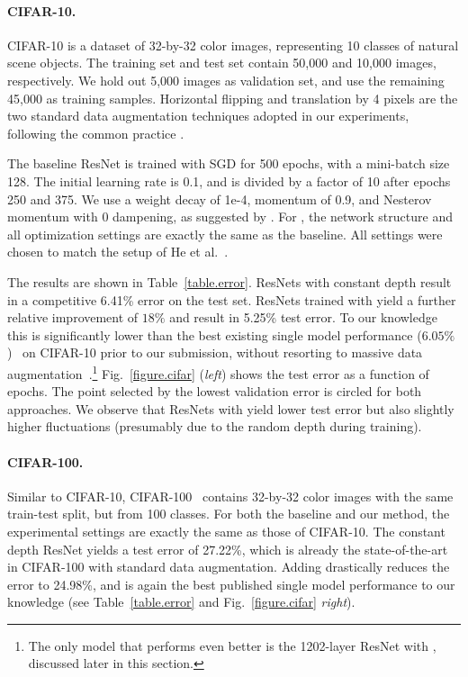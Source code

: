 \paragraph{\textbf{CIFAR-10.}}
CIFAR-10 \cite{krizhevsky2009learning} is a dataset of 32-by-32 color images, representing 10 classes of natural scene objects. The training set and test set contain 50,000 and 10,000 images, respectively. We hold out 5,000 images as validation set, and use the remaining 45,000 as training samples. Horizontal flipping and translation by 4 pixels are the two standard data augmentation techniques adopted in our experiments, following the common practice \cite{goodfellow2013maxout,icml2013_wan13,lin2013network,lee2014deeply,springenberg2014striving,agostinelli2014learning,lee2015generalizing}.

The baseline ResNet is trained with SGD for 500 epochs, with a mini-batch size 128. The initial learning rate is 0.1, and is divided by a factor of 10 after epochs 250 and 375. We use a weight decay of 1e-4, momentum of 0.9, and Nesterov momentum \cite{sutskever2013importance} with 0 dampening, as suggested by \cite{blogpostresnet}. For \name{}, the network structure and all optimization settings are exactly the same as the baseline. All settings were chosen to match the setup of He et al.~\cite{he2015deep}.

The results are shown in Table~\ref{table.error}. ResNets with constant depth result in a competitive 6.41\% error on the test set. ResNets trained with \name{} yield a further relative improvement of $18\%$ and result in 5.25\% test error.
To our knowledge this is significantly lower than the best existing single model performance ($6.05\%$)~\cite{lee2015generalizing} on CIFAR-10 prior to our submission, without resorting to massive data augmentation~\cite{graham2014fractional,springenberg2014striving}.\footnote{The only model that performs even better is the 1202-layer ResNet with \name{}, discussed later in this section. }
Fig.~\ref{figure.cifar} (\textit{left}) shows the test error as a function of epochs. The point selected by the lowest validation error is circled for both approaches. We observe that ResNets with \name{} yield lower test error but also slightly higher fluctuations (presumably due to the random depth during training).

\paragraph{\textbf{CIFAR-100.}}
Similar to CIFAR-10, CIFAR-100~\cite{krizhevsky2009learning} contains 32-by-32 color images with the same train-test split, but from 100 classes. For both the baseline and our method, the experimental settings are exactly the same as those of CIFAR-10. The constant depth ResNet yields a test error of 27.22\%, which is already the state-of-the-art in CIFAR-100 with standard data augmentation. Adding \name{} drastically reduces the error to 24.98\%, and is again the best published single model performance to our knowledge (see Table~\ref{table.error} and Fig.~\ref{figure.cifar} \textit{right}).

